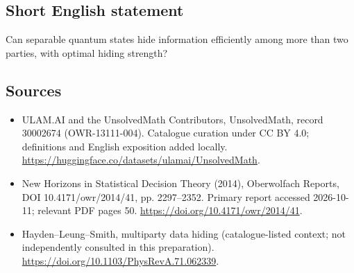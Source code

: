 \documentclass[11pt]{article}
\begin{document}
\subsection{Short English statement}
Can separable quantum states hide information efficiently among more than two parties, with optimal hiding strength?
\subsection{Sources}
\begin{itemize}
\item[\hypertarget{source:30002674:1}{S1}] ULAM.AI and the UnsolvedMath Contributors, UnsolvedMath, record 30002674 (OWR-13111-004). Catalogue curation under CC BY 4.0; definitions and English exposition added locally.
\url{https://huggingface.co/datasets/ulamai/UnsolvedMath}.
\item[\hypertarget{source:30002674:2}{S2}] New Horizons in Statistical Decision Theory (2014), Oberwolfach Reports, DOI 10.4171/owr/2014/41, pp. 2297--2352. Primary report accessed 2026-10-11; relevant PDF pages 50.
\url{https://doi.org/10.4171/owr/2014/41}.
\item[\hypertarget{source:30002674:3}{S3}] Hayden--Leung--Smith, multiparty data hiding (catalogue-listed context; not independently consulted in this preparation).
\url{https://doi.org/10.1103/PhysRevA.71.062339}.
\end{itemize}
\label{end:30002674}
\end{document}
